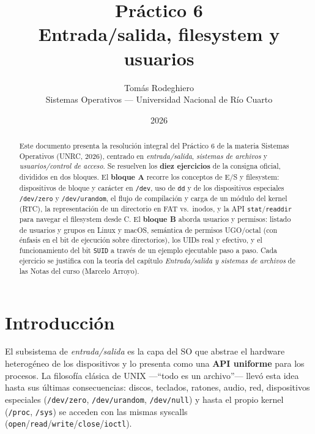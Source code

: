 \documentclass[11pt,a4paper]{article}
\title{
    \vspace{-2.5em}
    \textbf{Práctico 6} \\[0.3em]
    \large Entrada/salida, filesystem y usuarios
}
\author{
    Tomás Rodeghiero \\
    \small Sistemas Operativos --- Universidad Nacional de Río Cuarto
}
\date{2026}
\begin{document}
\maketitle

\begin{abstract}
\noindent
Este documento presenta la resolución integral del Práctico 6 de la
materia Sistemas Operativos (UNRC, 2026), centrado en
\emph{entrada/salida}, \emph{sistemas de archivos} y
\emph{usuarios/control de acceso}. Se resuelven los \textbf{diez
ejercicios} de la consigna oficial, divididos en dos bloques. El
\textbf{bloque A} recorre los conceptos de E/S y filesystem: dispositivos
de bloque y carácter en \texttt{/dev}, uso de \texttt{dd} y de los
dispositivos especiales \texttt{/dev/zero} y \texttt{/dev/urandom}, el
flujo de compilación y carga de un módulo del kernel (RTC), la
representación de un directorio en FAT vs.\ inodos, y la API
\texttt{stat}/\texttt{readdir} para navegar el filesystem desde C. El
\textbf{bloque B} aborda usuarios y permisos: listado de usuarios y
grupos en Linux y macOS, semántica de permisos UGO/octal (con énfasis
en el bit de ejecución sobre directorios), los UIDs real y efectivo, y
el funcionamiento del bit \texttt{SUID} a través de un ejemplo
ejecutable paso a paso. Cada ejercicio se justifica con la teoría del
capítulo \emph{Entrada/salida y sistemas de archivos} de las Notas del
curso (Marcelo Arroyo).
\end{abstract}

\tableofcontents
\bigskip

\section{Introducción}

El subsistema de \emph{entrada/salida} es la capa del SO que abstrae el
hardware heterogéneo de los dispositivos y lo presenta como una
\textbf{API uniforme} para los procesos. La filosofía clásica de UNIX
---``todo es un archivo''--- llevó esta idea hasta sus últimas
consecuencias: discos, teclados, ratones, audio, red, dispositivos
especiales (\texttt{/dev/zero}, \texttt{/dev/urandom},
\texttt{/dev/null}) y hasta el propio kernel (\texttt{/proc},
\texttt{/sys}) se acceden con las mismas syscalls
(\texttt{open}/\texttt{read}/\texttt{write}/\texttt{close}/\texttt{ioctl}).
\end{document}
